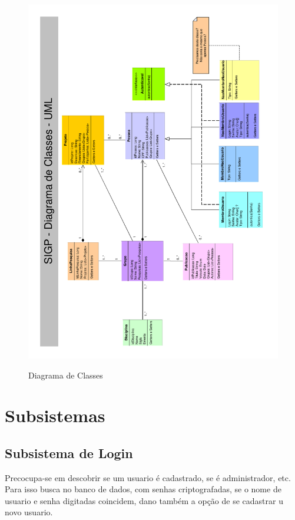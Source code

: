 \documentclass[11pt, a4paper]{article}
\begin{document}
		\begin{figure}[h]
            \center
            \includegraphics[width=12cm, angle=270]{SIGP-UML-classes.pdf}
            \label{DiagramaDeClasses}
            \caption{Diagrama de Classes}
        \end{figure}
		\newpage
		
	\section{Subsistemas}
	
            \subsection{Subsistema  de Login}
                Precocupa-se em descobrir se um usuario é cadastrado, se é administrador, etc. Para isso busca no banco de dados, com senhas criptografadas, se o nome de usuario e senha digitadas coincidem, dano também a opção de se cadastrar u novo usuario.
            
\end{document}
